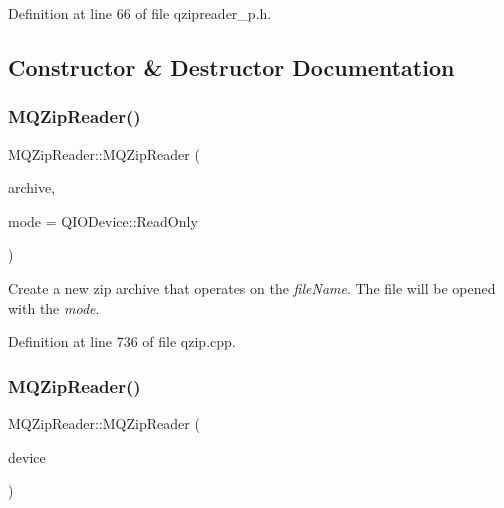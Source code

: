 Definition at line 66 of file qzipreader\+\_\+p.\+h.



\subsection{Constructor \& Destructor Documentation}
\mbox{\label{class_m_q_zip_reader_a3b7f7b85a1674386dc4a7b7240f4e2dc}} 
\subsubsection{\texorpdfstring{M\+Q\+Zip\+Reader()}{MQZipReader()}\hspace{0.1cm}{\footnotesize\ttfamily [1/2]}}
{\footnotesize\ttfamily M\+Q\+Zip\+Reader\+::\+M\+Q\+Zip\+Reader (\begin{DoxyParamCaption}\item[{const Q\+String \&}]{archive,  }\item[{Q\+I\+O\+Device\+::\+Open\+Mode}]{mode = {\ttfamily QIODevice\+:\+:ReadOnly} }\end{DoxyParamCaption})}

Create a new zip archive that operates on the {\itshape file\+Name}. The file will be opened with the {\itshape mode}. 

Definition at line 736 of file qzip.\+cpp.

\mbox{\label{class_m_q_zip_reader_ab8f57ca2da4654b4696b0fa7635d2cff}} 
\subsubsection{\texorpdfstring{M\+Q\+Zip\+Reader()}{MQZipReader()}\hspace{0.1cm}{\footnotesize\ttfamily [2/2]}}
{\footnotesize\ttfamily M\+Q\+Zip\+Reader\+::\+M\+Q\+Zip\+Reader (\begin{DoxyParamCaption}\item[{Q\+I\+O\+Device $\ast$}]{device }\end{DoxyParamCaption})\hspace{0.3cm}{\ttfamily [explicit]}}

